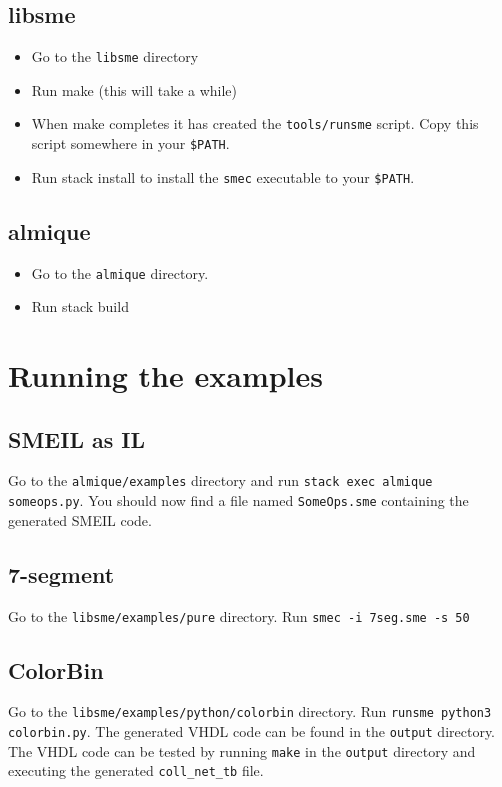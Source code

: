 \subsection{libsme}
\begin{itemize}
\item Go to the {\tt libsme} directory
\item Run {\ttfamily make} (this will take a while)
\item When {\ttfamily make} completes it has created the \texttt{tools/runsme}
  script. Copy this script somewhere in your \texttt{\$PATH}.
\item Run {\ttfamily stack install} to install the {\tt smec} executable to your
  {\tt \$PATH}.
\end{itemize}

\subsection{almique}
\begin{itemize}
\item Go to the {\tt almique} directory.
\item Run {\ttfamily stack build}
\end{itemize}

\section{Running the examples}
\subsection{SMEIL as IL}
Go to the {\tt almique/examples} directory and run {\tt stack exec almique
  someops.py}. You should now find a file named {\tt SomeOps.sme} containing the
generated SMEIL code.
\enlargethispage{2em}
\subsection{7-segment}
Go to the {\tt libsme/examples/pure} directory. Run {\tt smec -i 7seg.sme -s 50}

\subsection{ColorBin}
Go to the {\tt libsme/examples/python/colorbin} directory. Run {\tt runsme
  python3 colorbin.py}. The generated VHDL code can be found in the {\tt output}
directory. The VHDL code can be tested by running {\tt make} in the {\tt output}
directory and executing the generated {\tt coll_net_tb} file.

